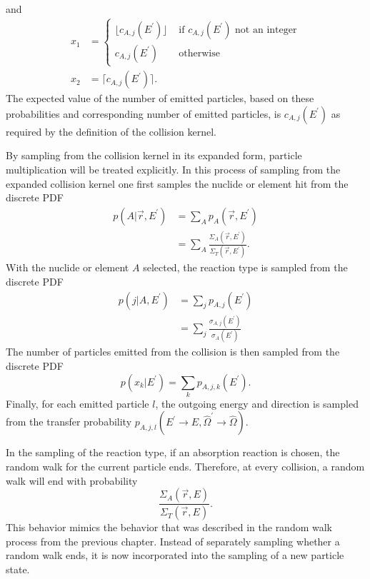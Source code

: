 and
\begin{align}
  x_1 & = 
  \begin{cases}
    \lfloor c_{A,j}(E^{'}) \rfloor & \text{ if } c_{A,j}(E^{'})
    \text{ not an integer} \\
    c_{A,j}(E^{'}) & \text{ otherwise}
  \end{cases} \\
  x_2 & = \lceil c_{A,j}(E^{'}) \rceil.
\end{align}
The expected value of the number of emitted particles, based on these 
probabilities and corresponding number of emitted particles, is $c_{A,j}(E^{'})$
as required by the definition of the collision kernel.

By sampling from the collision kernel in its expanded form, particle
multiplication will be treated explicitly. In this process of sampling from
the expanded collision kernel one first samples the nuclide or element hit from 
the discrete PDF 
\begin{align}
  p(A|\vec{r},E^{'}) & = \sum_A p_A(\vec{r},E^{'}) \nonumber \\
  & = \sum_A \frac{\Sigma_A(\vec{r},E^{'})}{\Sigma_T(\vec{r},E^{'})}.
\end{align}
With the nuclide or element $A$ selected, the reaction type is sampled from the 
discrete PDF 
\begin{align}
  p(j|A,E^{'}) & = \sum_j p_{A,j}(E^{'}) \nonumber \\
  & = \sum_j \frac{\sigma_{A,j}(E^{'})}{\sigma_A(E^{'})} 
\end{align}
The number of particles emitted from the collision is then sampled from the 
discrete PDF
\begin{equation}
  p(x_k|E^{'}) = \sum_k p_{A,j,k}(E^{'}).
\end{equation}
Finally, for each emitted particle $l$, the outgoing energy and direction is 
sampled from the transfer probability 
$p_{A,j,l}(E^{'} \to E,\hat{\Omega}^{'} \to \hat{\Omega})$. 

In the sampling of the reaction type, if an absorption reaction is chosen, the 
random walk for the current particle ends. Therefore, at every collision, a 
random walk will end with probability 
\begin{equation*}
  \frac{\Sigma_A(\vec{r},E)}{\Sigma_T(\vec{r},E)}.
\end{equation*} 
This behavior mimics the behavior that was described in the random walk process 
from the previous chapter. Instead of separately sampling whether a random walk 
ends, it is now incorporated into the sampling of a new particle state.

